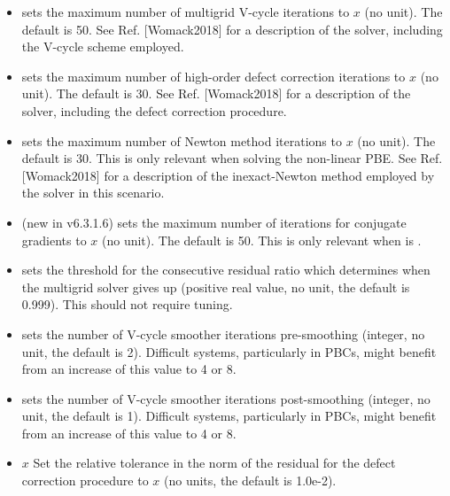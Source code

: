 \documentclass[letterpaper,10pt,english]{sphinxmanual}
\begin{document}
\begin{itemize}
\item {} 
 sets the maximum number of multigrid
V-cycle iterations to \(x\) (no unit). The default is 50. See
Ref. {[}Womack2018{]} for a description of the solver, including the V-cycle scheme
employed.

\item {} 
 sets the maximum number of high-order defect
correction iterations to \(x\) (no unit). The default is 30. See
Ref. {[}Womack2018{]} for a description of the solver, including the defect
correction procedure.

\item {} 
 sets the maximum number of Newton method
iterations to \(x\) (no unit). The default is 30. This is only
relevant when solving the non-linear PBE. See Ref. {[}Womack2018{]} for a description
of the inexact-Newton method employed by the solver in this scenario.

\item {} 
 (new in v6.3.1.6) sets the maximum number of
iterations for conjugate gradients to \(x\) (no unit). The
default is 50. This is only relevant when  is .

\item {} 
 sets the threshold for the consecutive
residual ratio which determines when the multigrid solver gives up
(positive real value, no unit, the default is 0.999). This should not
require tuning.

\item {} 
 sets the number of V-cycle smoother
iterations pre-smoothing (integer, no unit, the default is 2).
Difficult systems, particularly in PBCs, might benefit from an
increase of this value to 4 or 8.

\item {} 
 sets the number of V-cycle smoother
iterations post-smoothing (integer, no unit, the default is 1).
Difficult systems, particularly in PBCs, might benefit from an
increase of this value to 4 or 8.

\item {} 
 \(x\) Set the relative tolerance in the norm
of the residual for the defect correction procedure to \(x\) (no
units, the default is 1.0e-2).


\end{itemize}
\end{document}
